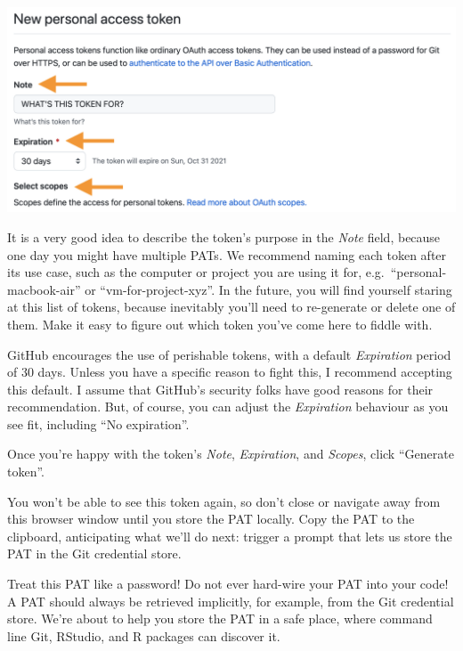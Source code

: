 \documentclass[
]{book}
\begin{document}
\begin{center}\includegraphics[width=1\linewidth]{img/new-personal-access-token-screenshot} \end{center}

It is a very good idea to describe the token's purpose in the \emph{Note} field, because one day you might have multiple PATs.
We recommend naming each token after its use case, such as the computer or project you are using it for, e.g.~``personal-macbook-air'' or ``vm-for-project-xyz''.
In the future, you will find yourself staring at this list of tokens, because inevitably you'll need to re-generate or delete one of them.
Make it easy to figure out which token you've come here to fiddle with.

GitHub encourages the use of perishable tokens, with a default \emph{Expiration} period of 30 days.
Unless you have a specific reason to fight this, I recommend accepting this default.
I assume that GitHub's security folks have good reasons for their recommendation.
But, of course, you can adjust the \emph{Expiration} behaviour as you see fit, including ``No expiration''.

Once you're happy with the token's \emph{Note}, \emph{Expiration}, and \emph{Scopes}, click ``Generate token''.

You won't be able to see this token again, so don't close or navigate away from this browser window until you store the PAT locally.
Copy the PAT to the clipboard, anticipating what we'll do next: trigger a prompt that lets us store the PAT in the Git credential store.

Treat this PAT like a password!
Do not ever hard-wire your PAT into your code!
A PAT should always be retrieved implicitly, for example, from the Git credential store.
We're about to help you store the PAT in a safe place, where command line Git, RStudio, and R packages can discover it.
\end{document}
